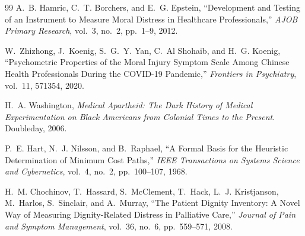 \documentclass[12pt]{article}
\theoremstyle{definition}
\theoremstyle{remark}
\begin{document}
\begin{thebibliography}{99}
A.~B. Hamric, C.~T. Borchers, and E.~G. Epstein, ``Development and Testing of an Instrument to Measure Moral Distress in Healthcare Professionals,'' \emph{AJOB Primary Research}, vol.~3, no.~2, pp.~1--9, 2012.

W.~Zhizhong, J.~Koenig, S.~G.~Y. Yan, C.~Al Shohaib, and H.~G. Koenig, ``Psychometric Properties of the Moral Injury Symptom Scale Among Chinese Health Professionals During the COVID-19 Pandemic,'' \emph{Frontiers in Psychiatry}, vol.~11, 571354, 2020.

H.~A. Washington, \emph{Medical Apartheid: The Dark History of Medical Experimentation on Black Americans from Colonial Times to the Present}.  Doubleday, 2006.

P.~E. Hart, N.~J. Nilsson, and B.~Raphael, ``A Formal Basis for the Heuristic Determination of Minimum Cost Paths,'' \emph{IEEE Transactions on Systems Science and Cybernetics}, vol.~4, no.~2, pp.~100--107, 1968.

H.~M. Chochinov, T.~Hassard, S.~McClement, T.~Hack, L.~J. Kristjanson, M.~Harlos, S.~Sinclair, and A.~Murray, ``The Patient Dignity Inventory: A Novel Way of Measuring Dignity-Related Distress in Palliative Care,'' \emph{Journal of Pain and Symptom Management}, vol.~36, no.~6, pp.~559--571, 2008.

\end{thebibliography}
\end{document}
